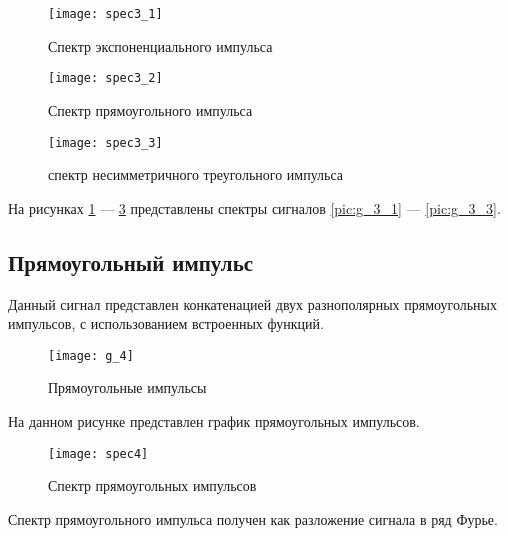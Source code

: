 \begin{figure}[H]
	\begin{center}
		\texttt{[image: spec3\_1]}
		\caption{Спектр экспоненциального импульса} 
		\label{pic:spec3_1} %
	\end{center}
\end{figure}
\begin{figure}[H]
	\begin{center}
		\texttt{[image: spec3\_2]}
		\caption{Спектр прямоугольного импульса} 
		\label{pic:spec3_2} %
	\end{center}
\end{figure}
\begin{figure}[H]
	\begin{center}
		\texttt{[image: spec3\_3]}
		\caption{спектр несимметричного треугольного импульса} 
		\label{pic:spec3_3} %
	\end{center}
\end{figure}
На рисунках  \ref{pic:spec3_1} — \ref{pic:spec3_3} представлены спектры сигналов \ref{pic:g_3_1} — \ref{pic:g_3_3}.

\subsection{Прямоугольный импульс}


\parindent=1cm
Данный сигнал представлен конкатенацией двух разнополярных прямоугольных импульсов, с использованием встроенных функций.

\begin{figure}[H]
	\begin{center}
		\texttt{[image: g\_4]}
		\caption{Прямоугольные импульсы} 
		\label{pic:g_4} %
	\end{center}
\end{figure}
На данном рисунке представлен график прямоугольных импульсов.

\begin{figure}[H]
	\begin{center}
		\texttt{[image: spec4]}
		\caption{Спектр прямоугольных импульсов} 
		\label{pic:spec4} %
	\end{center}
\end{figure}
Спектр прямоугольного импульса получен как разложение сигнала в ряд Фурье.

